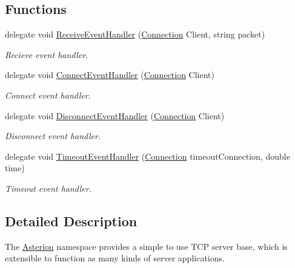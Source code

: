 \subsection*{Functions}
\begin{DoxyCompactItemize}
\item 
\hypertarget{namespaceAsterion_a5ef58966894a2b631dc841b7cdd1a5e2}{delegate void \hyperlink{namespaceAsterion_a5ef58966894a2b631dc841b7cdd1a5e2}{Receive\-Event\-Handler} (\hyperlink{classAsterion_1_1Connection}{Connection} Client, string packet)}\label{namespaceAsterion_a5ef58966894a2b631dc841b7cdd1a5e2}

\begin{DoxyCompactList}\small\item\em Recieve event handler. \end{DoxyCompactList}\item 
\hypertarget{namespaceAsterion_aa915f460db30cba69c8c917d94da98e8}{delegate void \hyperlink{namespaceAsterion_aa915f460db30cba69c8c917d94da98e8}{Connect\-Event\-Handler} (\hyperlink{classAsterion_1_1Connection}{Connection} Client)}\label{namespaceAsterion_aa915f460db30cba69c8c917d94da98e8}

\begin{DoxyCompactList}\small\item\em Connect event handler. \end{DoxyCompactList}\item 
\hypertarget{namespaceAsterion_a96f853b30e28b18bf4afa727d5f144e0}{delegate void \hyperlink{namespaceAsterion_a96f853b30e28b18bf4afa727d5f144e0}{Disconnect\-Event\-Handler} (\hyperlink{classAsterion_1_1Connection}{Connection} Client)}\label{namespaceAsterion_a96f853b30e28b18bf4afa727d5f144e0}

\begin{DoxyCompactList}\small\item\em Disconnect event handler. \end{DoxyCompactList}\item 
\hypertarget{namespaceAsterion_a5083085ed7d41e00c1ecce1efcd5a096}{delegate void \hyperlink{namespaceAsterion_a5083085ed7d41e00c1ecce1efcd5a096}{Timeout\-Event\-Handler} (\hyperlink{classAsterion_1_1Connection}{Connection} timeout\-Connection, double time)}\label{namespaceAsterion_a5083085ed7d41e00c1ecce1efcd5a096}

\begin{DoxyCompactList}\small\item\em Timeout event handler. \end{DoxyCompactList}\end{DoxyCompactItemize}


\subsection{Detailed Description}
The \hyperlink{namespaceAsterion}{Asterion} namespace provides a simple to use T\-C\-P server base, which is extensible to function as many kinds of server applications. 
